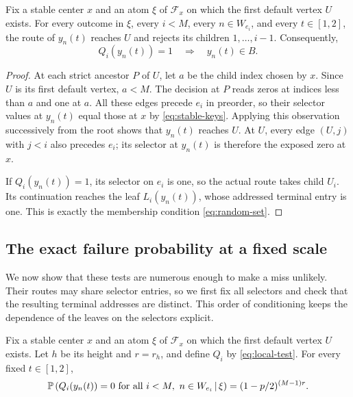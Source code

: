 \begin{lemma}
 \label{lem:routing}
Fix a stable center \(x\) and an atom \(\xi\) of \(\mathcal F_x\)
on which the first default vertex \(U\) exists. For every outcome in
\(\xi\), every \(i<M\), every \(n\in W_{e_i}\), and every
\(t\in[1,2]\), the route of \(y_n(t)\) reaches \(U\) and rejects its
children \(1,\ldots,i-1\). Consequently,
\begin{equation}
 \label{eq:local-hit}
 Q_i(y_n(t))=1\quad\Longrightarrow\quad y_n(t)\in B.
\end{equation}
\end{lemma}

\begin{proof}
At each strict ancestor \(P\) of \(U\), let \(a\) be the child index
chosen by \(x\). Since \(U\) is its first default vertex, \(a<M\).
The decision at \(P\) reads zeros at indices less than \(a\) and one
at \(a\). All these edges precede \(e_i\) in preorder, so their
selector values at \(y_n(t)\) equal those at \(x\) by
\eqref{eq:stable-keys}. Applying this observation successively from the
root shows that \(y_n(t)\) reaches \(U\). At \(U\), every edge
\((U,j)\) with \(j<i\) also precedes \(e_i\); its selector at
\(y_n(t)\) is therefore the exposed zero at \(x\).

If \(Q_i(y_n(t))=1\), its selector on \(e_i\) is one, so the actual
route takes child \(U_i\). Its continuation reaches the leaf
\(L_i(y_n(t))\), whose addressed terminal entry is one. This is exactly
the membership condition \eqref{eq:random-set}.
\end{proof}

\subsection{The exact failure probability at a fixed scale}

We now show that these tests are numerous enough to make a miss
unlikely. Their routes may share selector entries, so we first fix all
selectors and check that the resulting terminal addresses are distinct.
This order of conditioning keeps the dependence of the leaves on the
selectors explicit.

\begin{lemma}
 \label{lem:independent-tests}
Fix a stable center \(x\) and an atom \(\xi\) of \(\mathcal F_x\)
on which the first default vertex \(U\) exists. Let \(h\) be its
height and \(r=r_h\), and define \(Q_i\) by \eqref{eq:local-test}.
For every fixed \(t\in[1,2]\),
\begin{equation}
 \label{eq:test-failure}
 \mathbb P\left(
 Q_i(y_n(t))=0\text{ for all }i<M,\ n\in W_{e_i}
 \,\middle|\,\xi\right)
 =(1-p/2)^{(M-1)r}.
\end{equation}
\end{lemma}

